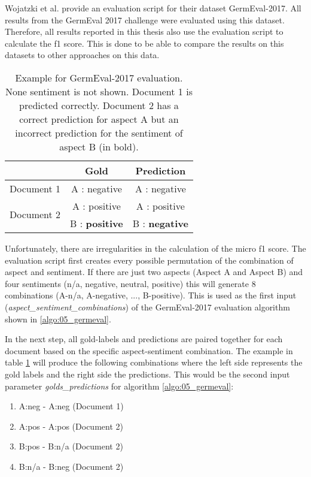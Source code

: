 Wojatzki et al. \cite{Wojatzki} provide an evaluation script for their dataset GermEval-2017. All results from the GermEval 2017 challenge were evaluated using this dataset. Therefore, all results reported in this thesis also use the evaluation script to calculate the f1 score. This is done to be able to compare the results on this datasets to other approaches on this data.

\begin{table}[hbt]
	\centering
	\label{tab:05_germevalEvaluationExample}
	\caption{Example for GermEval-2017 evaluation. None sentiment is not shown. Document 1 is predicted correctly. Document 2 has a correct prediction for aspect A but an incorrect prediction for the sentiment of aspect B {(in bold)}.}
	\begin{tabular}{@{}lcc}
		\toprule 
		& \textbf{Gold} & \textbf{Prediction} \\ 
		\hline 
		Document 1 & A : negative & A : negative \\ 
		\hline 
		\multirow{2}{*}{Document 2} & A : positive & A : positive \\ 
		& B : \textbf{positive} & B : \textbf{negative} \\ 
		\hline 
	\end{tabular}
\end{table}

Unfortunately, there are irregularities in the calculation of the micro f1 score. The evaluation script first creates every possible permutation of the combination of aspect and sentiment. If there are just two aspects {(Aspect A and Aspect B)} and four sentiments {(n/a, negative, neutral, positive)} this will generate 8 combinations {(A-n/a, A-negative, ..., B-positive)}. This is used as the first input {(\textit{aspect\_sentiment\_combinations})} of the GermEval-2017 evaluation algorithm shown in \ref{algo:05_germeval}.

In the next step, all gold-labels and predictions are paired together for each document based on the specific aspect-sentiment combination. The example in table \ref{tab:05_germevalEvaluationExample} will produce the following combinations where the left side represents the gold labels and the right side the predictions. This would be the second input parameter \textit{golds\_predictions} for algorithm \ref{algo:05_germeval}: 

\begin{enumerate}
	\item A:neg - A:neg (Document 1)
	\item A:pos - A:pos (Document 2)
	\item B:pos - B:n/a (Document 2)
	\item B:n/a - B:neg (Document 2)
\end{enumerate}

